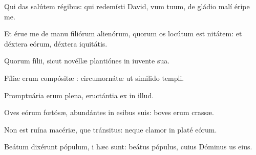 \item {}

\item Qui das salútem régibus:\pscross{} qui redemísti David, vum tuum,\psstar{} de gládio malí éripe me.

\item Et érue me de manu filiórum alienórum,\pscross{} quorum os locútum est nitátem:\psstar{} et déxtera eórum, déxtera iquitátis.

\item Quorum fílii, sicut novéllæ plantiónes\psstar{} in iuvente sua.

\item Fíliæ erum compósitæ :\psstar{} circumornátæ ut similido templi.

\item Promptuária erum plena,\psstar{} eructántia ex  in illud.

\item Oves eórum fœtósæ, abundántes in esibus suis:\psstar{} boves erum crassæ.

\item Non est ruína macériæ, que tránsitus:\psstar{} neque clamor in platé eórum.

\item Beátum dixérunt pópulum, i hæc sunt:\psstar{} beátus pópulus, cuius Dóminus us eius.
